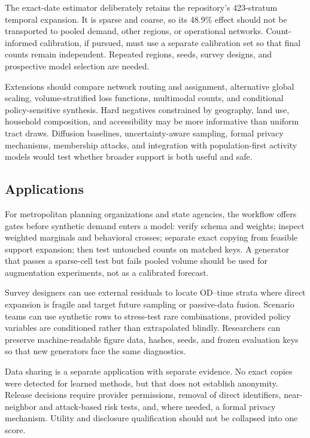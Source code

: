 \documentclass[numbered]{trbunofficial}
\begin{document}
The exact-date estimator deliberately retains the repository's 423-stratum temporal expansion. It is sparse and coarse, so its 48.9\% effect should not be transported to pooled demand, other regions, or operational networks. Count-informed calibration, if pursued, must use a separate calibration set so that final counts remain independent. Repeated regions, seeds, survey designs, and prospective model selection are needed.

Extensions should compare network routing and assignment, alternative global scaling, volume-stratified loss functions, multimodal counts, and conditional policy-sensitive synthesis. Hard negatives constrained by geography, land use, household composition, and accessibility may be more informative than uniform tract draws. Diffusion baselines, uncertainty-aware sampling, formal privacy mechanisms, membership attacks, and integration with population-first activity models would test whether broader support is both useful and safe.

\subsection{Applications}

For metropolitan planning organizations and state agencies, the workflow offers gates before synthetic demand enters a model: verify schema and weights; inspect weighted marginals and behavioral crosses; separate exact copying from feasible support expansion; then test untouched counts on matched keys. A generator that passes a sparse-cell test but fails pooled volume should be used for augmentation experiments, not as a calibrated forecast.

Survey designers can use external residuals to locate OD--time strata where direct expansion is fragile and target future sampling or passive-data fusion. Scenario teams can use synthetic rows to stress-test rare combinations, provided policy variables are conditioned rather than extrapolated blindly. Researchers can preserve machine-readable figure data, hashes, seeds, and frozen evaluation keys so that new generators face the same diagnostics.

Data sharing is a separate application with separate evidence. No exact copies were detected for learned methods, but that does not establish anonymity. Release decisions require provider permissions, removal of direct identifiers, near-neighbor and attack-based risk tests, and, where needed, a formal privacy mechanism. Utility and disclosure qualification should not be collapsed into one score.
\end{document}
